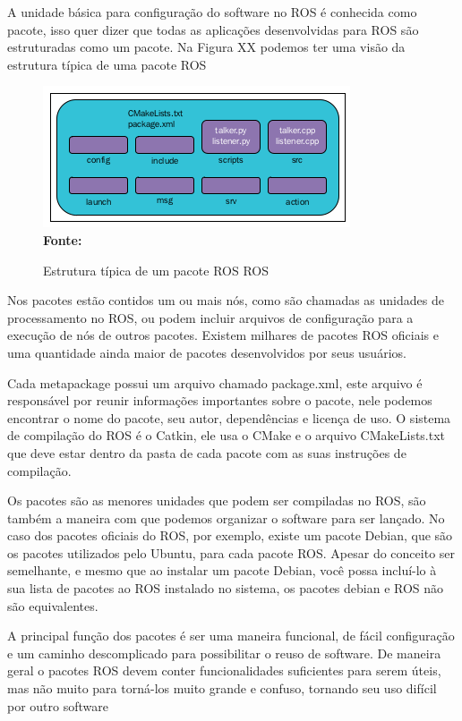 A unidade básica para configuração do software no ROS é conhecida como pacote, isso quer dizer que todas as aplicações desenvolvidas para ROS são estruturadas como um pacote. Na Figura XX podemos ter uma visão da estrutura típica de uma pacote ROS

\begin{figure}[ht]
	\caption{Estrutura típica de um pacote ROS ROS}
	\begin{center}
		\includegraphics[scale=0.8]{imagens/rospackagestruture.png}\\
		{\small \textbf{Fonte:} }
    \end{center}\label{fig:rospacotestrut}
\end{figure}

Nos pacotes estão contidos um ou mais nós, como são chamadas as unidades de processamento no ROS, ou podem incluir arquivos de configuração para a execução de nós de outros pacotes. Existem milhares de pacotes ROS oficiais e uma quantidade ainda maior de pacotes desenvolvidos por seus usuários. 

Cada metapackage possui um arquivo chamado package.xml, este arquivo é responsável por reunir informações importantes sobre o pacote, nele podemos encontrar o nome do pacote, seu autor, dependências e licença de uso. O sistema de compilação do ROS é o Catkin, ele usa o CMake e o arquivo CMakeLists.txt que deve estar dentro da pasta de cada pacote com as suas instruções de compilação. 

Os pacotes são as menores unidades que podem ser compiladas no ROS, são também  a maneira com que podemos organizar o software para ser lançado. No caso dos pacotes oficiais do ROS, por exemplo, existe um pacote Debian, que são os pacotes utilizados pelo Ubuntu, para cada pacote ROS. Apesar do conceito ser semelhante, e mesmo que ao instalar um pacote Debian, você possa incluí-lo à sua lista de pacotes ao ROS instalado no sistema, os pacotes debian e ROS não são equivalentes. 

A principal função dos pacotes é ser uma maneira funcional, de fácil configuração e um caminho descomplicado para possibilitar o reuso de software. De maneira geral o pacotes ROS devem conter funcionalidades suficientes para serem úteis, mas não muito para torná-los muito grande e confuso, tornando seu uso difícil por outro software 



